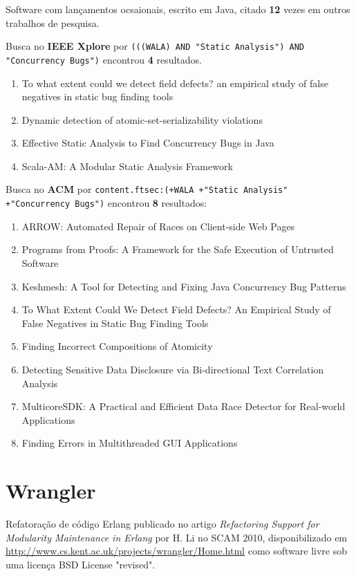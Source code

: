 Software com lançamentos ocsaionais,
escrito em Java,
citado {\bf 12} vezes em outros trabalhos de pesquisa.

Busca no {\bf IEEE Xplore} por
\texttt{(((WALA) AND "Static Analysis") AND "Concurrency Bugs")}
encontrou {\bf 4}
resultados.

\begin{enumerate}
\item To what extent could we detect field defects? an empirical study of false negatives in static bug finding tools
\item Dynamic detection of atomic-set-serializability violations
\item Effective Static Analysis to Find Concurrency Bugs in Java
\item Scala-AM: A Modular Static Analysis Framework
\end{enumerate}

Busca no {\bf ACM} por
\texttt{content.ftsec:(+WALA +"Static Analysis" +"Concurrency Bugs")}
encontrou {\bf 8}
resultados:

\begin{enumerate}
\item ARROW: Automated Repair of Races on Client-side Web Pages
\item Programs from Proofs: A Framework for the Safe Execution of Untrusted Software
\item Keshmesh: A Tool for Detecting and Fixing Java Concurrency Bug Patterns
\item To What Extent Could We Detect Field Defects? An Empirical Study of False Negatives in Static Bug Finding Tools
\item Finding Incorrect Compositions of Atomicity
\item Detecting Sensitive Data Disclosure via Bi-directional Text Correlation Analysis
\item MulticoreSDK: A Practical and Efficient Data Race Detector for Real-world Applications
\item Finding Errors in Multithreaded GUI Applications
\end{enumerate}

\section{Wrangler}

Refatoração de código Erlang
publicado no artigo {\it Refactoring Support for Modularity Maintenance in Erlang}
por H. Li
no SCAM 2010,
disponibilizado em \url{http://www.cs.kent.ac.uk/projects/wrangler/Home.html}
como software livre
sob uma licença BSD License "revised".

